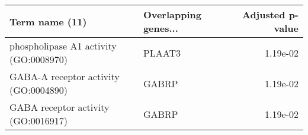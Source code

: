 \begin{tabular}{llr}
\toprule
                        Term name (11) & Overlapping genes... &  Adjusted p-value \\
\midrule
phospholipase A1 activity (GO:0008970) &               PLAAT3 &          1.19e-02 \\
 GABA-A receptor activity (GO:0004890) &                GABRP &          1.19e-02 \\
   GABA receptor activity (GO:0016917) &                GABRP &          1.19e-02 \\
\bottomrule
\end{tabular}
